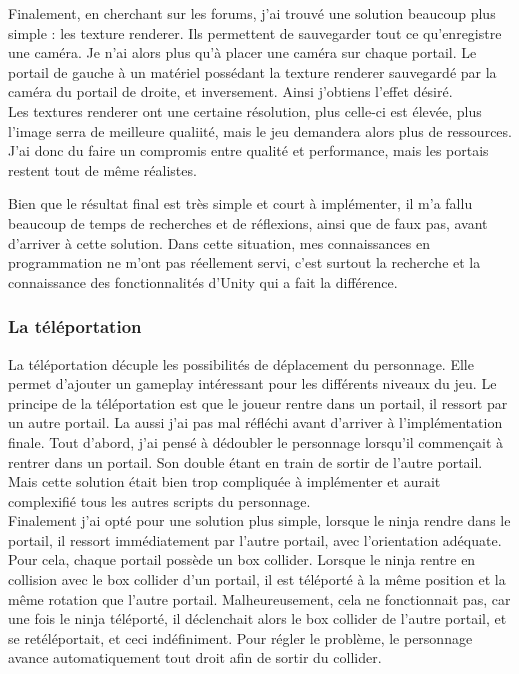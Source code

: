 \documentclass[12pt]{article}
\begin{document}
Finalement, en cherchant sur les forums, j'ai trouvé une solution beaucoup plus simple : les texture renderer. Ils permettent de sauvegarder tout ce qu'enregistre une caméra. Je n'ai alors plus qu'à placer une caméra sur chaque portail. Le portail de gauche à un matériel possédant la texture renderer sauvegardé par la caméra du portail de droite, et inversement. Ainsi j'obtiens l'effet désiré.\\
Les textures renderer ont une certaine résolution, plus celle-ci est élevée, plus l'image serra de meilleure qualiité, mais le jeu demandera alors plus de ressources. J'ai donc du faire un compromis entre qualité et performance, mais les portais restent tout de même réalistes.

Bien que le résultat final est très simple et court à implémenter, il m'a fallu beaucoup de temps de recherches et de réflexions, ainsi que de faux pas, avant d'arriver à cette solution. Dans cette situation, mes connaissances en programmation ne m'ont pas réellement servi, c'est surtout la recherche et la connaissance des fonctionnalités d'Unity qui a fait la différence.

\subsubsection{La téléportation}

La téléportation décuple les possibilités de déplacement du personnage. Elle permet d'ajouter un gameplay intéressant pour les différents niveaux du jeu. Le principe de la téléportation est que le joueur rentre dans un portail, il ressort par un autre portail. La aussi j'ai pas mal réfléchi avant d'arriver à l'implémentation finale. Tout d'abord, j'ai pensé à dédoubler le personnage lorsqu'il commençait à rentrer dans un portail. Son double étant en train de sortir de l'autre portail. Mais cette solution était bien trop compliquée à implémenter et aurait complexifié tous les autres scripts du personnage.\\
Finalement j'ai opté pour une solution plus simple, lorsque le ninja rendre dans le portail, il ressort immédiatement par l'autre portail, avec l'orientation adéquate.\\
Pour cela, chaque portail possède un box collider. Lorsque le ninja rentre en collision avec le box collider d'un portail, il est téléporté à la même position et la même rotation que l'autre portail. Malheureusement, cela ne fonctionnait pas, car une fois le ninja téléporté, il déclenchait alors le box collider de l'autre portail, et se retéléportait, et ceci indéfiniment. Pour régler le problème, le personnage avance automatiquement tout droit afin de sortir du collider.\\
\end{document}
